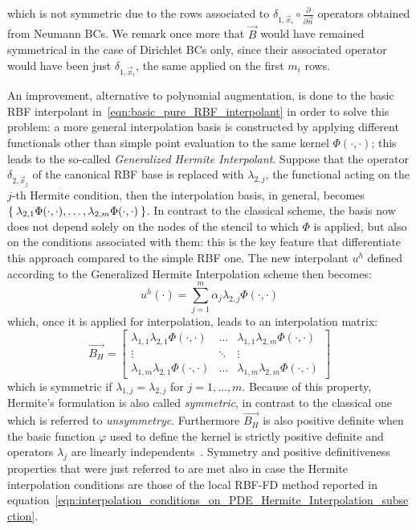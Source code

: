 which is not symmetric due to the rows associated to $\delta_{1,\vec{x}_{i}} \circ \frac{\partial}{\partial \vec{n}}$ operators obtained from Neumann BCs. We remark once more that $\vec{B}$ would have remained symmetrical in the case of Dirichlet BCs only, since their associated operator would have been just $\delta_{1,\vec{x}_{i}}$, the same applied on the first $m_i$ rows.

An improvement, alternative to polynomial augmentation, is done to the basic RBF interpolant in~\eqref{eqn:basic_pure_RBF_interpolant} in order to solve this problem: a more general interpolation basis is constructed by applying different functionals other than simple point evaluation to the same kernel $\Phi(\cdot, \cdot)$; this leads to the so-called \emph{Generalized Hermite Interpolant}. Suppose that the operator $\delta_{2, \vec{x}_j}$ of the canonical RBF base is replaced with $\lambda_{2,j}$, the functional acting on the $j$-th Hermite condition, then the interpolation basis, in general, becomes $\Set{\lambda_{2,1} \Phi(\cdot, \cdot), \dots, \lambda_{2,m} \Phi(\cdot, \cdot)}$. In contrast to the classical scheme, the basis now does not depend solely on the nodes of the stencil to which $\Phi$ is applied, but also on the conditions associated with them: this is the key feature that differentiate this approach compared to the simple RBF one. The new interpolant $u^h$ defined according to the Generalized Hermite Interpolation scheme then becomes:
\begin{equation}
	\label{eqn:pure_Hermite_interpolant}
	u^h(\cdot) = \sum_{j=1}^{m} \alpha_j \lambda_{2,j} \Phi(\cdot,\cdot)
\end{equation}
which, once it is applied for interpolation, leads to an interpolation matrix:
\begin{equation}
	\vec{B_H} =
	\begin{bmatrix}
		\lambda_{1,1} \lambda_{2,1} \Phi(\cdot, \cdot)  &  \dots  & \lambda_{1,1} \lambda_{2,m} \Phi(\cdot, \cdot)  \\
		\vdots											& \ddots  & \vdots											\\
		\lambda_{1,m} \lambda_{2,1} \Phi(\cdot, \cdot)  &  \dots  & \lambda_{1,m} \lambda_{2,m} \Phi(\cdot, \cdot)
	\end{bmatrix}
\end{equation}
which is symmetric if $\lambda_{1,j} = \lambda_{2,j}$ for $j = 1, \dots, m$. Because of this property, Hermite's formulation is also called \emph{symmetric}, in contrast to the classical one which is referred to \emph{unsymmetryc}. Furthermore $\vec{B_H}$ is also positive definite when the basic function $\varphi$ used to define the kernel is strictly positive definite and operators $\lambda_j$ are linearly independents~\cite{Miotti:phd_thesis}. Symmetry and positive definitiveness properties that were just referred to are met also in case the Hermite interpolation conditions are those of the local RBF-FD method reported in equation~\eqref{eqn:interpolation_conditions_on_PDE_Hermite_Interpolation_subsection}.

